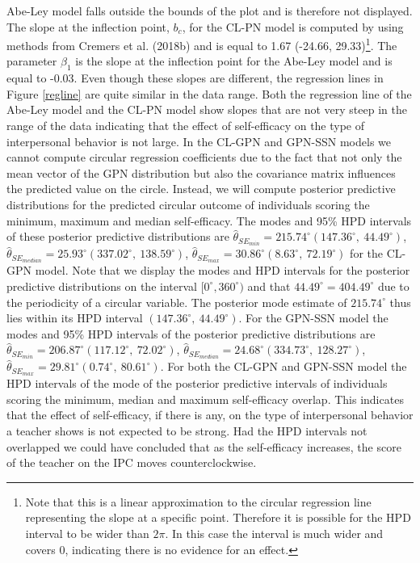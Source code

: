 \documentclass[man]{apa6}
\let\rmarkdownfootnote\footnote%
\def\footnote{\protect\rmarkdownfootnote}
\begin{document}
Abe-Ley model falls outside the bounds of the plot and is therefore not
displayed. The slope at the inflection point, \(b_c\), for the CL-PN model is
computed by using methods from Cremers et al. (2018b) and is equal to 1.67
(-24.66, 29.33)\footnote{Note that this is a linear approximation to the
circular regression line representing the slope at a specific point. Therefore
it is possible for the HPD interval to be wider than $2\pi$. In this case the
interval is much wider and covers 0, indicating there is no evidence for an
effect.}. The parameter \(\beta_1\) is the slope at the inflection point for the
Abe-Ley model and is equal to -0.03. Even though these slopes are
different, the regression lines in Figure \ref{regline} are quite similar in the
data range. Both the regression line of the Abe-Ley model and the CL-PN model
show slopes that are not very steep in the range of the data indicating that the
effect of self-efficacy on the type of interpersonal behavior is not large.
\newline
\indent In the CL-GPN and GPN-SSN models we cannot compute circular regression
coefficients due to the fact that not only the mean vector of the GPN
distribution but also the covariance matrix influences the predicted value on
the circle. Instead, we will compute posterior predictive distributions for the
predicted circular outcome of individuals scoring the minimum, maximum and
median self-efficacy. The modes and 95\% HPD intervals of these posterior
predictive distributions are \(\hat{\theta}_{SE_{min}} = 215.74^\circ (147.36^\circ, \: 44.49^\circ)\), \(\hat{\theta}_{SE_{median}} = 25.93^\circ (337.02^\circ, \: 138.59^\circ)\), \(\hat{\theta}_{SE_{max}} = 30.86^\circ (8.63^\circ, \: 72.19^\circ)\) for the CL-GPN model. Note that we display the
modes and HPD intervals for the posterior predictive distributions on the
interval \([0^\circ, 360^\circ)\) and that \(44.49^\circ = 404.49^\circ\) due to the
periodicity of a circular variable. The posterior mode estimate of
\(215.74^\circ\) thus lies within its HPD interval \((147.36^\circ, \: 44.49^\circ)\). For the GPN-SSN model the modes and 95\% HPD intervals of the
posterior predictive distributions are \(\hat{\theta}_{SE_{min}} = 206.87^\circ (117.12^\circ, \: 72.02^\circ)\), \(\hat{\theta}_{SE_{median}} = 24.68^\circ (334.73^\circ, \: 128.27^\circ)\), \(\hat{\theta}_{SE_{max}} = 29.81^\circ (0.74^\circ, \: 80.61^\circ)\). For both the CL-GPN and GPN-SSN model the HPD
intervals of the mode of the posterior predictive intervals of individuals
scoring the minimum, median and maximum self-efficacy overlap. This indicates
that the effect of self-efficacy, if there is any, on the type of interpersonal
behavior a teacher shows is not expected to be strong. Had the HPD intervals not
overlapped we could have concluded that as the self-efficacy increases, the
score of the teacher on the IPC moves counterclockwise.\newline
\end{document}
